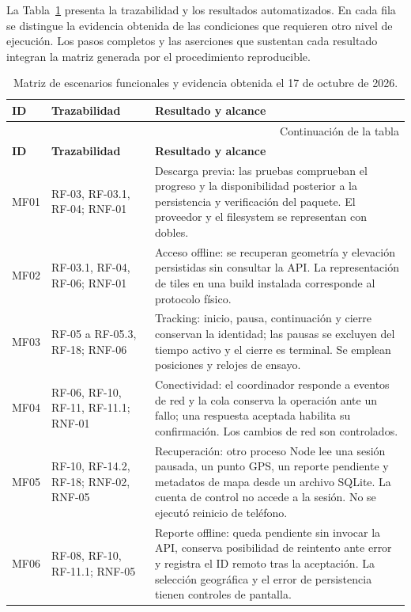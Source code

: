 La Tabla~\ref{tab:matriz-funcional} presenta la trazabilidad y los resultados automatizados. En cada fila se distingue la evidencia obtenida de las condiciones que requieren otro nivel de ejecución. Los pasos completos y las aserciones que sustentan cada resultado integran la matriz generada por el procedimiento reproducible.

\begingroup
\small
\setlength{\tabcolsep}{4pt}
\renewcommand{\arraystretch}{1.1}
\begin{longtable}{|p{1.15cm}|p{3.25cm}|p{9.35cm}|}
\caption{Matriz de escenarios funcionales y evidencia obtenida el 17 de octubre de 2026.}\label{tab:matriz-funcional} \\
\hline
\textbf{ID} & \textbf{Trazabilidad} & \textbf{Resultado y alcance} \\
\hline
\endfirsthead
\multicolumn{3}{r}{\footnotesize Continuación de la tabla} \\
\hline
\textbf{ID} & \textbf{Trazabilidad} & \textbf{Resultado y alcance} \\
\hline
\endhead
\hline
\endfoot
\hline
\endlastfoot
MF01 & RF-03, RF-03.1, RF-04; RNF-01 & Descarga previa: las pruebas comprueban el progreso y la disponibilidad posterior a la persistencia y verificación del paquete. El proveedor y el filesystem se representan con dobles. \\
\hline
MF02 & RF-03.1, RF-04, RF-06; RNF-01 & Acceso offline: se recuperan geometría y elevación persistidas sin consultar la API. La representación de tiles en una build instalada corresponde al protocolo físico. \\
\hline
MF03 & RF-05 a RF-05.3, RF-18; RNF-06 & Tracking: inicio, pausa, continuación y cierre conservan la identidad; las pausas se excluyen del tiempo activo y el cierre es terminal. Se emplean posiciones y relojes de ensayo. \\
\hline
MF04 & RF-06, RF-10, RF-11, RF-11.1; RNF-01 & Conectividad: el coordinador responde a eventos de red y la cola conserva la operación ante un fallo; una respuesta aceptada habilita su confirmación. Los cambios de red son controlados. \\
\hline
MF05 & RF-10, RF-14.2, RF-18; RNF-02, RNF-05 & Recuperación: otro proceso Node lee una sesión pausada, un punto GPS, un reporte pendiente y metadatos de mapa desde un archivo SQLite. La cuenta de control no accede a la sesión. No se ejecutó reinicio de teléfono. \\
\hline
MF06 & RF-08, RF-10, RF-11.1; RNF-05 & Reporte offline: queda pendiente sin invocar la API, conserva posibilidad de reintento ante error y registra el ID remoto tras la aceptación. La selección geográfica y el error de persistencia tienen controles de pantalla. \\

\end{longtable}

